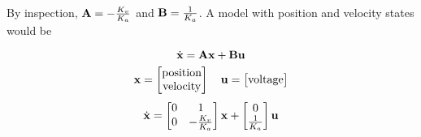 By inspection, $\mathbf{A} = -\frac{K_v}{K_a}$ and $\mathbf{B} = \frac{1}{K_a}$. A
model with position and velocity states would be
\begin{theorem}
  \begin{equation*}
    \dot{\mathbf{x}} = \mathbf{A}\mathbf{x} + \mathbf{B}\mathbf{u}
  \end{equation*}
  \begin{equation*}
    \mathbf{x} =
    \begin{bmatrix}
      \text{position} \\
      \text{velocity}
    \end{bmatrix}
    \quad
    \mathbf{u} =
    \begin{bmatrix}
      \text{voltage}
    \end{bmatrix}
  \end{equation*}
  \begin{equation}
    \dot{\mathbf{x}} =
    \begin{bmatrix}
      0 & 1 \\
      0 & -\frac{K_v}{K_a}
    \end{bmatrix}
    \mathbf{x} +
    \begin{bmatrix}
      0 \\
      \frac{1}{K_a}
    \end{bmatrix}
    \mathbf{u}
  \end{equation}
\end{theorem}
